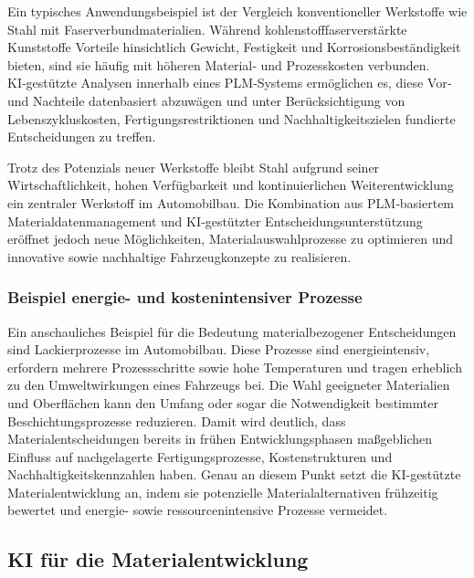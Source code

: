 Ein typisches Anwendungsbeispiel ist der Vergleich konventioneller Werkstoffe wie Stahl mit Faserverbundmaterialien. Während kohlenstofffaserverstärkte Kunststoffe Vorteile hinsichtlich Gewicht, Festigkeit und Korrosionsbeständigkeit bieten, sind sie häufig mit höheren Material‑ und Prozesskosten verbunden. KI‑gestützte Analysen innerhalb eines PLM‑Systems ermöglichen es, diese Vor‑ und Nachteile datenbasiert abzuwägen und unter Berücksichtigung von Lebenszykluskosten, Fertigungsrestriktionen und Nachhaltigkeitszielen fundierte Entscheidungen zu treffen. \cite{pendar2022review}

Trotz des Potenzials neuer Werkstoffe bleibt Stahl aufgrund seiner Wirtschaftlichkeit, hohen Verfügbarkeit und kontinuierlichen Weiterentwicklung ein zentraler Werkstoff im Automobilbau. Die Kombination aus PLM‑basiertem Materialdatenmanagement und KI‑gestützter Entscheidungsunterstützung eröffnet jedoch neue Möglichkeiten, Materialauswahlprozesse zu optimieren und innovative sowie nachhaltige Fahrzeugkonzepte zu realisieren. \cite{fentahun2018materials}


\subsubsection{Beispiel energie- und kostenintensiver Prozesse}
Ein anschauliches Beispiel für die Bedeutung materialbezogener Entscheidungen sind Lackierprozesse im Automobilbau. Diese Prozesse sind energieintensiv, erfordern mehrere Prozessschritte sowie hohe Temperaturen und tragen erheblich zu den Umweltwirkungen eines Fahrzeugs bei.
Die Wahl geeigneter Materialien und Oberflächen kann den Umfang oder sogar die Notwendigkeit bestimmter Beschichtungsprozesse reduzieren. Damit wird deutlich, dass Materialentscheidungen bereits in frühen Entwicklungsphasen maßgeblichen Einfluss auf nachgelagerte Fertigungsprozesse, Kostenstrukturen und Nachhaltigkeitskennzahlen haben. Genau an diesem Punkt setzt die KI-gestützte Materialentwicklung an, indem sie potenzielle Materialalternativen frühzeitig bewertet und energie- sowie ressourcenintensive Prozesse vermeidet. \cite{sustanibility} %

\subsection{KI für die Materialentwicklung}
\cite{kreutzer2019kunstliche}





